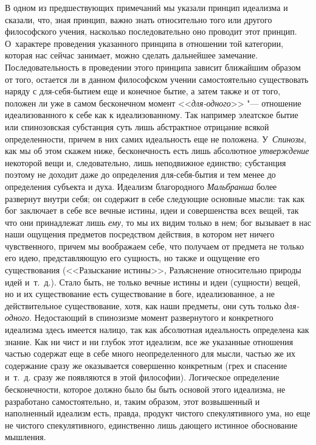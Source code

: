 В одном из предшествующих примечаний мы указали принцип идеализма и сказали,
что, зная принцип, важно знать относительно того или другого философского
учения, насколько последовательно оно проводит этот принцип. О~характере
проведения указанного принципа в отношении той категории, которая нас
сейчас занимает, можно сделать дальнейшее замечание. Последовательность в
проведении этого принципа зависит ближайшим образом от того, остается ли в
данном философском учении самостоятельно существовать наряду с
для-себя-бытием еще и конечное бытие, а затем также и от того, положен ли
уже в самом бесконечном момент <<{\em для-одного}>>
"--- отношение идеализованного к себе как к идеализованному. Так например
элеатское бытие или спинозовская субстанция суть лишь абстрактное отрицание
всякой определенности, причем в них самих идеальность еще не положена.
У~{\em Спинозы}, как мы об этом скажем ниже,
бесконечность есть лишь абсолютное {\em утверждение}
некоторой вещи и, следовательно, лишь неподвижное единство; субстанция
поэтому не доходит даже до определения для-себя-бытия и тем менее до
определения субъекта и духа. Идеализм благородного
{\em Мальбранша} более развернут внутри себя; он
содержит в себе следующие основные мысли: так как бог заключает в себе все
вечные истины, идеи и совершенства всех вещей, так что они принадлежат лишь
{\em ему}, то мы их видим только в нем; бог вызывает в
нас наши ощущения предметов посредством действия, в котором нет ничего
чувственного, причем мы воображаем себе, что получаем от предмета не только
его идею, представляющую его сущность, но также и ощущение его
существования (<<Разыскание истины>>, Разъяснение относительно природы идей
и~т.~д.). Стало быть, не только вечные истины и идеи (сущности) вещей, но и
их существование есть существование в боге, идеализованное, а не
действительное существование, хотя, как наши предметы, они суть только
{\em для-одного}. Недостающий в спинозизме момент
развернутого и конкретного идеализма здесь имеется налицо, так как
абсолютная идеальность определена как знание. Как ни чист и ни глубок этот
идеализм, все же указанные отношения частью содержат еще в себе много
неопределенного для мысли, частью же их содержание сразу же оказывается
совершенно конкретным (грех и спасение и~т.~д. сразу же появляются в этой
философии). Логическое определение бесконечности, которое должно было бы
быть основой этого идеализма, не разработано самостоятельно, и, таким
образом, этот возвышенный и наполненный идеализм есть, правда, продукт
чистого спекулятивного ума, но еще не чистого спекулятивного, единственно
лишь дающего истинное обоснование мышления.

